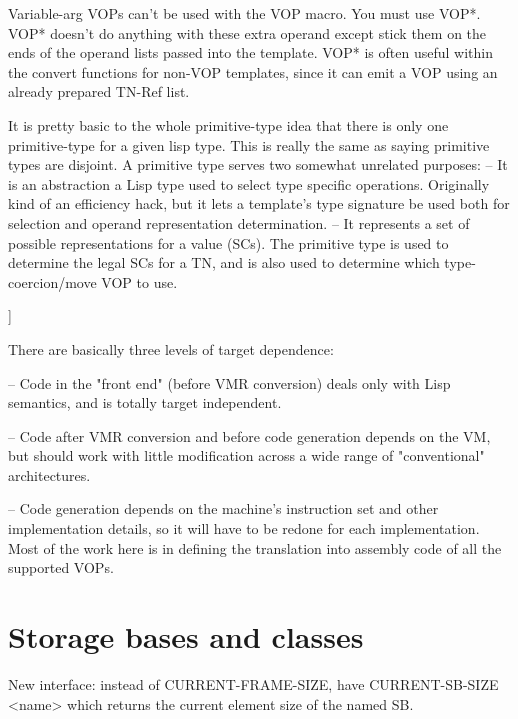     Variable-arg VOPs can't be used with the VOP macro.  You must use VOP*.
    VOP* doesn't do anything with these extra operand except stick them on the
    ends of the operand lists passed into the template.  VOP* is often useful
    within the convert functions for non-VOP templates, since it can emit a VOP
    using an already prepared TN-Ref list.
    

    It is pretty basic to the whole primitive-type idea that there is only one
    primitive-type for a given lisp type.  This is really the same as saying
    primitive types are disjoint.  A primitive type serves two somewhat
    unrelated purposes:
     -- It is an abstraction a Lisp type used to select type specific
        operations.  Originally kind of an efficiency hack, but it lets a
        template's type signature be used both for selection and operand
        representation determination.
     -- It represents a set of possible representations for a value (SCs).  The
        primitive type is used to determine the legal SCs for a TN, and is also
        used to determine which type-coercion/move VOP to use.

]

There are basically three levels of target dependence:

 -- Code in the "front end" (before VMR conversion) deals only with Lisp
    semantics, and is totally target independent.

 -- Code after VMR conversion and before code generation depends on the VM,
    but should work with little modification across a wide range of
    "conventional" architectures.

 -- Code generation depends on the machine's instruction set and other
    implementation details, so it will have to be redone for each
    implementation.  Most of the work here is in defining the translation into
    assembly code of all the supported VOPs.



\chapter{Storage bases and classes}
New interface: instead of CURRENT-FRAME-SIZE, have CURRENT-SB-SIZE <name> which
returns the current element size of the named SB.

